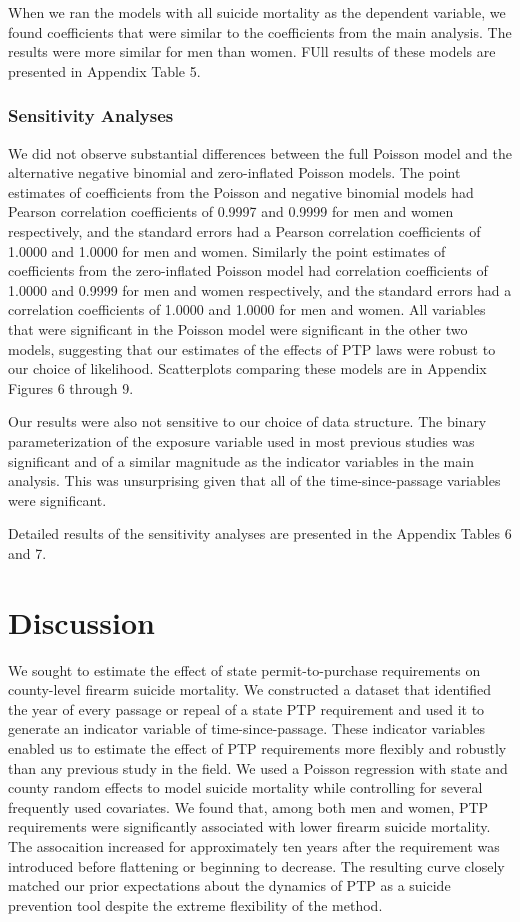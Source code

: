 \documentclass[]{article}
\begin{document}
When we ran the models with all suicide mortality as the dependent
variable, we found coefficients that were similar to the coefficients
from the main analysis. The results were more similar for men than
women. FUll results of these models are presented in Appendix Table 5.

\subsubsection{Sensitivity Analyses}\label{sensitivity-analyses-1}

We did not observe substantial differences between the full Poisson
model and the alternative negative binomial and zero-inflated Poisson
models. The point estimates of coefficients from the Poisson and
negative binomial models had Pearson correlation coefficients of 0.9997
and 0.9999 for men and women respectively, and the standard errors had a
Pearson correlation coefficients of 1.0000 and 1.0000 for men and women.
Similarly the point estimates of coefficients from the zero-inflated
Poisson model had correlation coefficients of 1.0000 and 0.9999 for men
and women respectively, and the standard errors had a correlation
coefficients of 1.0000 and 1.0000 for men and women. All variables that
were significant in the Poisson model were significant in the other two
models, suggesting that our estimates of the effects of PTP laws were
robust to our choice of likelihood. Scatterplots comparing these models
are in Appendix Figures 6 through 9.

Our results were also not sensitive to our choice of data structure. The
binary parameterization of the exposure variable used in most previous
studies was significant and of a similar magnitude as the indicator
variables in the main analysis. This was unsurprising given that all of
the time-since-passage variables were significant.

Detailed results of the sensitivity analyses are presented in the
Appendix Tables 6 and 7.

\section{Discussion}\label{discussion}

We sought to estimate the effect of state permit-to-purchase
requirements on county-level firearm suicide mortality. We constructed a
dataset that identified the year of every passage or repeal of a state
PTP requirement and used it to generate an indicator variable of
time-since-passage. These indicator variables enabled us to estimate the
effect of PTP requirements more flexibly and robustly than any previous
study in the field. We used a Poisson regression with state and county
random effects to model suicide mortality while controlling for several
frequently used covariates. We found that, among both men and women, PTP
requirements were significantly associated with lower firearm suicide
mortality. The assocaition increased for approximately ten years after
the requirement was introduced before flattening or beginning to
decrease. The resulting curve closely matched our prior expectations
about the dynamics of PTP as a suicide prevention tool despite the
extreme flexibility of the method.
\end{document}
